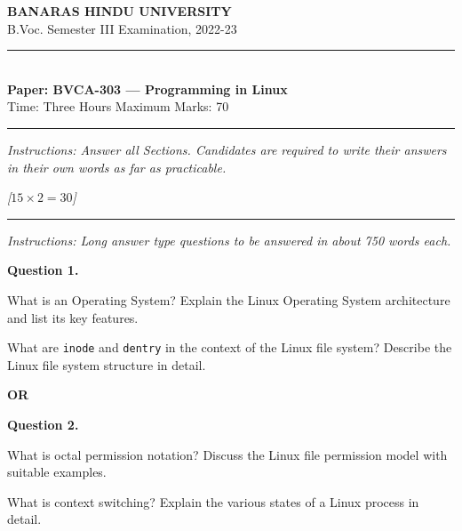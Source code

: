 \documentclass[11pt,a4paper]{article}
\newcommand{\pts}[1]{\hfill   \textit{[#1]}}
\begin{document}
\begin{center}
  {\large\bfseries BANARAS HINDU UNIVERSITY}\\[2pt]
  {\normalsize B.Voc. Semester III Examination, 2022-23}\\[6pt]
  \rule{0.8\linewidth}{0.5pt}\\[6pt]
  {\large\bfseries Paper: BVCA-303 --- Programming in Linux}\\[4pt]
  {\normalsize Time: Three Hours \hfill Maximum Marks: 70}
\end{center}

\rule{\linewidth}{0.4pt}

\smallskip



\noindent   \textit{Instructions: Answer all Sections. Candidates are required to write their answers in their own words as far as practicable.}

\bigskip

\bigskip


\pts{$15  \times 2 = 30$}
\rule{\linewidth}{0.4pt}\smallskip




\noindent   \textit{Instructions: Long answer type questions to be answered in about 750 words each.}

\medskip


\noindent   \textbf{Question 1.}

\begin{parts}
  \item What is an Operating System? Explain the Linux Operating System architecture and list its key features.
  \item What are   \texttt{inode} and   \texttt{dentry} in the context of the Linux file system? Describe the Linux file system structure in detail.
\end{parts}
\centerline{   \textbf{OR}}

\medskip


\noindent   \textbf{Question 2.}

\begin{parts}
  \item What is octal permission notation? Discuss the Linux file permission model with suitable examples.
  \item What is context switching? Explain the various states of a Linux process in detail.
\end{parts}

\bigskip
\end{document}
